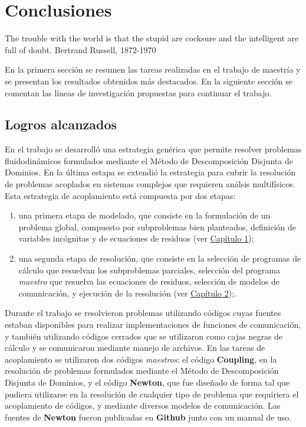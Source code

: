 \chapter{Conclusiones}
\label{conclusiones}
\chapterquote
{The trouble with the world is that the stupid are cocksure and the intelligent are full of doubt.}
{Bertrand Russell, 1872-1970}

En la primera sección se resumen las tareas realizadas en el trabajo de maestría y se presentan los resultados obtenidos más destacados.
En la siguiente sección se comentan las líneas de investigación propuestas para continuar el trabajo.

\section{Logros alcanzados}
\label{logros}

En el trabajo se desarrolló una estrategia genérica que permite resolver problemas fluidodinámicos formulados mediante el Método de Descomposición Disjunta de Dominios.
En la última estapa se extendió la estrategia para cubrir la resolución de problemas acoplados en sistemas complejos que requieren análsis multifísicos.
Esta estrategia de acoplamiento está compuesta por dos etapas:
\begin{enumerate}
\item una primera etapa de modelado, que consiste en la formulación de un problema global, compuesto por subproblemas bien planteados, definición de variables incógnitas y de ecuaciones de residuos (ver \hyperlink{chapter.1}{Capítulo 1});
\item una segunda etapa de resolución, que consiste en la selección de programas de cálculo que resuelvan los subproblemas parciales,
selección del programa \textit{maestro} que resuelva las ecuaciones de residuos, selección de modelos de comunicación, y ejecución de la resolución (ver \hyperlink{chapter.2}{Capítulo 2});.
\end{enumerate}

Durante el trabajo se resolvieron problemas utilizando códigos cuyas fuentes estaban disponibles para realizar implementaciones de funciones de comunicación,
y también utilizando códigos cerrados que se utilizaron como cajas negras de cálculo y se comunicaron mediante manejo de archivos.
En las tareas de acoplamiento se utilizaron dos códigos \textit{maestros}: el código \textbf{Coupling}, en la resolución de problemas formulados mediante el Método de Descomposición Disjunta de Dominios,
y el código \textbf{Newton}, que fue diseñado de forma tal que pudiera utilizarse en la resolución de cualquier tipo de problema que requiriera el acoplamiento de códigos,
y mediante diversos modelos de comunicación.
Las fuentes de \textbf{Newton} fueron publicadas en \textbf{Github} junto con un manual de uso.

